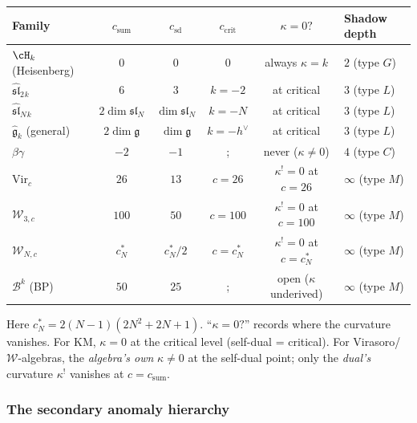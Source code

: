 \begin{computation}

\begin{center}
\renewcommand{\arraystretch}{1.3}
\begin{tabular}{lccccl}
\textbf{Family} & $c_{\mathrm{sum}}$ & $c_{\mathrm{sd}}$ &
$c_{\mathrm{crit}}$ & $\kappa = 0?$ & \textbf{Shadow depth} \\
\hline
$\cH_k$ (Heisenberg) & $0$ & $0$ & $0$ & always $\kappa = k$
& $2$ (type $G$) \\
$\widehat{\mathfrak{sl}}_2{}_k$ & $6$ & $3$ & $k = -2$ &
at critical & $3$ (type $L$) \\
$\widehat{\mathfrak{sl}}_N{}_k$ & $2\dim\mathfrak{sl}_N$
& $\dim\mathfrak{sl}_N$ & $k = -N$ & at critical &
$3$ (type $L$) \\
$\widehat{\mathfrak{g}}_k$ (general) & $2\dim\mathfrak{g}$
& $\dim\mathfrak{g}$ & $k = -h^\vee$ & at critical &
$3$ (type $L$) \\
$\beta\gamma$ & $-2$ & $-1$ &; & never ($\kappa \neq 0$)
& $4$ (type $C$) \\
$\mathrm{Vir}_c$ & $26$ & $13$ & $c = 26$ & $\kappa^! = 0$ at $c = 26$
& $\infty$ (type $M$) \\
$\mathcal{W}_{3,c}$ & $100$ & $50$ & $c = 100$ &
$\kappa^! = 0$ at $c = 100$ & $\infty$ (type $M$) \\
$\mathcal{W}_{N,c}$ & $c_N^*$ & $c_N^*/2$ & $c = c_N^*$ &
$\kappa^! = 0$ at $c = c_N^*$ & $\infty$ (type $M$) \\
$\mathcal{B}^k$ (BP) & $50$ & $25$ &; &
open ($\kappa$ underived) & $\infty$ (type $M$)
\end{tabular}
\end{center}

Here $c_N^* = 2(N-1)(2N^2+2N+1)$.
``$\kappa = 0?$'' records where the curvature vanishes.
For KM, $\kappa = 0$ at the critical level (self-dual = critical).
For Virasoro/$\mathcal{W}$-algebras, the \emph{algebra's own}
$\kappa \neq 0$ at the self-dual point; only the
\emph{dual's} curvature $\kappa^!$ vanishes at $c = c_{\mathrm{sum}}$.
\end{computation}

\subsubsection{The secondary anomaly hierarchy}

